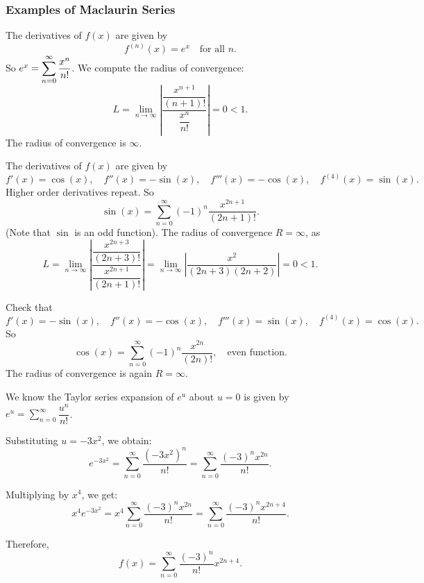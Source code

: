 \subsubsection{Examples of Maclaurin Series}
\begin{ex}[$f(x) = e^x$ at $a = 0$]
    The derivatives of $f(x)$ are given by 
    \[f^{(n)}(x) = e^x \quad \text{for all } n.\]
    So $e^x = \displaystyle\sum_{n=0}^{\infty} \dfrac{x^n}{n!}$. We compute the radius of convergence:
    \[L = \lim_{n\to \infty} \left| \dfrac{\dfrac{x^{n+1}}{(n+1)!}}{\dfrac{x^n}{n!}}\right| = 0 < 1.\]
    The radius of convergence is $\infty$.
\end{ex}

\begin{ex}[$f(x) = \sin(x)$ at $a = 0$]
    The derivatives of $f(x)$ are given by 
    \[f'(x) = \cos(x), \quad f''(x) = -\sin(x), \quad f'''(x) = -\cos(x), \quad f^{(4)}(x) = \sin(x).\]
    Higher order derivatives repeat. So 
    \[\sin(x) = \sum_{n=0}^{\infty} (-1)^n \dfrac{x^{2n+1}}{(2n+1)!}.\]
    (Note that $\sin$ is an odd function).
    The radius of convergence $R = \infty$, as
    \[L = \lim_{n\to \infty} \left| \dfrac{\dfrac{x^{2n+3}}{(2n+3)!}}{\dfrac{x^{2n+1}}{(2n+1)!}}\right| =\lim_{n\to \infty} \left| \dfrac{x^2}{(2n+3)(2n+2)}\right|= 0 < 1.\]
\end{ex}

\begin{ex}[$f(x) = \cos(x)$ at $a = 0$]    
    Check that \[f'(x) = -\sin(x), \quad f''(x) = -\cos(x), \quad f'''(x) = \sin(x), \quad f^{(4)}(x) = \cos(x).\]
    So \[\cos(x) = \sum_{n=0}^{\infty} (-1)^n \dfrac{x^{2n}}{(2n)!}, \quad \text{even function}. \]
    The radius of convergence is again $R = \infty$.
\end{ex}

\begin{ex}[$f(x) = x^4 e^{-3x^2}$ about $x = 0$]

    We know the Taylor series expansion of $e^u$ about $u = 0$ is given by $e^u = \sum_{n=0}^{\infty} \dfrac{u^n}{n!}$.
    
    Substituting $u = -3x^2$, we obtain:
    \[
    e^{-3x^2} = \sum_{n=0}^{\infty} \dfrac{(-3x^2)^n}{n!} = \sum_{n=0}^{\infty} \dfrac{(-3)^n x^{2n}}{n!}.
    \]
    
    Multiplying by $x^4$, we get:
    \[
    x^4 e^{-3x^2} = x^4 \sum_{n=0}^{\infty} \dfrac{(-3)^n x^{2n}}{n!} = \sum_{n=0}^{\infty} \dfrac{(-3)^n x^{2n + 4}}{n!}.
    \]
    
    Therefore, 
    \[f(x) = \sum_{n=0}^{\infty} \dfrac{(-3)^n}{n!} x^{2n + 4}.\]
\end{ex}
